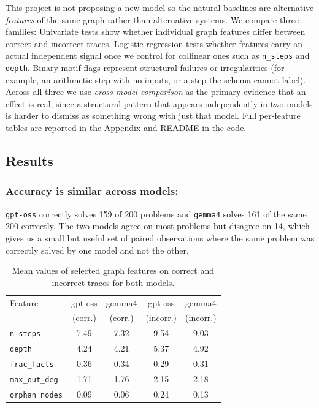 \documentclass[letterpaper]{article}
\begin{document}
This project is not proposing a new model so the natural baselines are
alternative \emph{features} of the same graph rather than alternative
systems. We compare three families: Univariate tests show whether
individual graph features differ between correct and incorrect
traces. Logistic regression tests whether features carry an actual independent
signal once we control for collinear ones such as
\texttt{n\_steps} and \texttt{depth}. Binary motif flags represent
structural failures or irregularities (for example, an arithmetic step
with no inputs, or a step the schema cannot label). Across all three
we use \emph{cross-model comparison} as the primary evidence that
an effect is real, since a structural pattern that appears
independently in two models is harder to dismiss as something wrong with just that model. Full per-feature tables are reported in
the Appendix and README in the code.

\subsection{Results}

\subsubsection*{Accuracy is similar across models:}
\texttt{gpt-oss} correctly solves 159 of 200 problems and \texttt{gemma4}
solves 161 of the same 200 correctly. The two models
agree on most problems but disagree on 14, which gives us a small
but useful set of paired observations where the same problem was
correctly solved by one model and not the other.


\begin{table}[h]
\centering
\small
\begin{tabular}{lcccc}
\hline
Feature & gpt-oss & gemma4 & gpt-oss & gemma4 \\
        & (corr.) & (corr.) & (incorr.) & (incorr.) \\
\hline
\texttt{n\_steps}      & 7.49 & 7.32 & 9.54 & 9.03 \\
\texttt{depth}         & 4.24 & 4.21 & 5.37 & 4.92 \\
\texttt{frac\_facts}   & 0.36 & 0.34 & 0.29 & 0.31 \\
\texttt{max\_out\_deg} & 1.71 & 1.76 & 2.15 & 2.18 \\
\texttt{orphan\_nodes} & 0.09 & 0.06 & 0.24 & 0.13 \\
\hline
\end{tabular}
\caption{Mean values of selected graph features on correct and
incorrect traces for both models.}
\label{tab:features}
\end{table}
\end{document}
